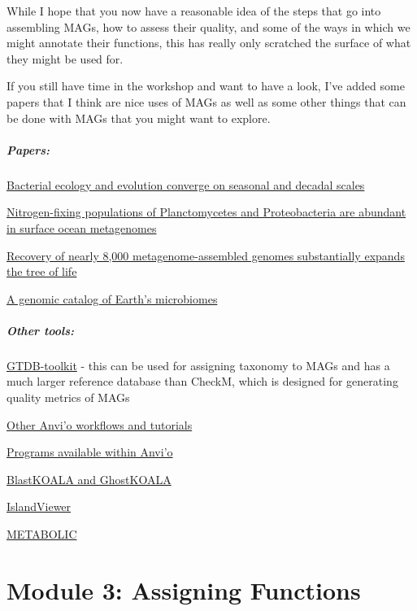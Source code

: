 \documentclass[
]{book}
\begin{document}
While I hope that you now have a reasonable idea of the steps that go into assembling MAGs, how to assess their quality, and some of the ways in which we might annotate their functions, this has really only scratched the surface of what they might be used for.

If you still have time in the workshop and want to have a look, I've added some papers that I think are nice uses of MAGs as well as some other things that can be done with MAGs that you might want to explore.

\paragraph{Papers:}\label{papers}

\href{https://www.biorxiv.org/content/10.1101/2024.02.06.579087v1}{Bacterial ecology and evolution converge on seasonal and decadal scales}

\href{https://www.nature.com/articles/s41564-018-0176-9}{Nitrogen-fixing populations of Planctomycetes and Proteobacteria are abundant in surface ocean metagenomes}

\href{https://www.nature.com/articles/s41564-017-0012-7}{Recovery of nearly 8,000 metagenome-assembled genomes substantially expands the tree of life}

\href{https://www.nature.com/articles/s41587-020-0718-6}{A genomic catalog of Earth's microbiomes}

\paragraph{Other tools:}\label{other-tools}

\href{https://github.com/Ecogenomics/GTDBTk}{GTDB-toolkit} - this can be used for assigning taxonomy to MAGs and has a much larger reference database than CheckM, which is designed for generating quality metrics of MAGs

\href{https://anvio.org/learn/}{Other Anvi'o workflows and tutorials}

\href{https://anvio.org/help/main/}{Programs available within Anvi'o}

\href{http://kegg.jp/ghostkoala/}{BlastKOALA and GhostKOALA}

\href{https://www.pathogenomics.sfu.ca/islandviewer}{IslandViewer}

\href{https://microbiomejournal.biomedcentral.com/articles/10.1186/s40168-021-01213-8}{METABOLIC}

\chapter{Module 3: Assigning Functions}\label{module-3-assigning-functions}
\end{document}
